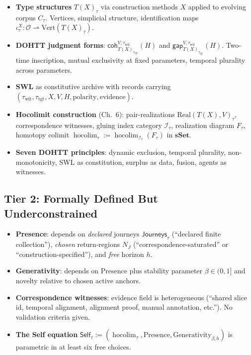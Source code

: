 \documentclass[11pt,a4paper]{article}
\newcommand{\Self}{\mathsf{Self}}
\newcommand{\Hocolim}{\operatorname{hocolim}}
\newcommand{\coh}{\mathsf{coh}}
\newcommand{\gap}{\mathsf{gap}}
\newcommand{\sSet}{\mathbf{sSet}}
\newcommand{\Journeys}{\mathsf{Journeys}}
\begin{document}
\begin{itemize}[nosep]
  \item \textbf{Type structures} $T(X)_\tau$ via construction methods $X$ applied to
    evolving corpus $C_\tau$. Vertices, simplicial structure, identification maps
    $\iota^X_\tau : \mathcal{O} \rightharpoonup \text{Vert}(T(X)_\tau)$.
  \item \textbf{DOHTT judgment forms}: $\coh_{T(X)_{\tau_{\text{tgt}}}}^{V, \tau_{\text{wit}}}(H)$
    and $\gap_{T(X)_{\tau_{\text{tgt}}}}^{V, \tau_{\text{wit}}}(H)$. Two-time inscription,
    mutual exclusivity at fixed parameters, temporal plurality across parameters.
  \item \textbf{SWL} as constitutive archive with records carrying
    $(\tau_{\text{wit}}, \tau_{\text{tgt}}, X, V, H, \text{polarity}, \text{evidence})$.
  \item \textbf{Hocolimit construction} (Ch.~6): pair-realizations $\text{Real}(T(X), V)_\tau$,
    correspondence witnesses, gluing index category $\mathcal{I}_\tau$, realization diagram
    $F_\tau$, homotopy colimit $\Hocolim_\tau := \Hocolim_{\mathcal{I}_\tau}(F_\tau)$ in $\sSet$.
  \item \textbf{Seven DOHTT principles}: dynamic exclusion, temporal plurality,
    non-monotonicity, SWL as constitution, surplus as data, fusion, agents as witnesses.
\end{itemize}

\subsection{Tier 2: Formally Defined But Underconstrained}

\begin{itemize}[nosep]
  \item \textbf{Presence}: depends on \emph{declared} journeys $\Journeys_\tau$
    (``declared finite collection''), \emph{chosen} return-regions $N_J$
    (``correspondence-saturated'' or ``construction-specified''), and
    \emph{free} horizon $h$.
  \item \textbf{Generativity}: depends on Presence plus stability parameter $\beta \in (0,1]$
    and novelty relative to chosen active anchors.
  \item \textbf{Correspondence witnesses}: evidence field is heterogeneous (``shared
    slice id, temporal alignment, alignment proof, manual annotation, etc.'').
    No validation criteria given.
  \item \textbf{The Self equation} $\Self_\tau := (\Hocolim_\tau, \text{Presence},
    \text{Generativity}_{\beta, h})$ is parametric in at least six free choices.
\end{itemize}
\end{document}
